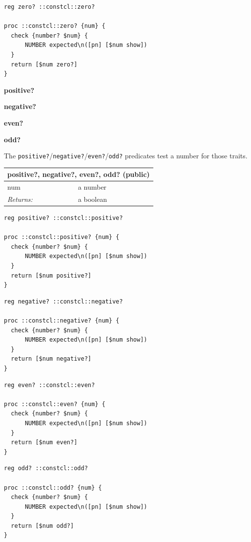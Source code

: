 \documentclass[twoside,9pt]{report}
\begin{document}
\noindent\makebox[\linewidth]{\rule{\linewidth}{0.4pt}}
\begin{lstlisting}
reg zero? ::constcl::zero?
 
proc ::constcl::zero? {num} {
  check {number? $num} {
      NUMBER expected\n([pn] [$num show])
  }
  return [$num zero?]
}
\end{lstlisting}
\noindent\makebox[\linewidth]{\rule{\linewidth}{0.4pt}}

\textbf{positive?}


\textbf{negative?}


\textbf{even?}


\textbf{odd?}


The \texttt{positive?}/\texttt{negative?}/\texttt{even?}/\texttt{odd?} predicates test a number for those traits.

\begin{tabular}{ |l l| }
\hline
\multicolumn{2}{|l|}{positive?, negative?, even?, odd? (public)} \\
\hline
num & a number \\
\textit{Returns:} & a boolean \\
\hline
\end{tabular}

\noindent\makebox[\linewidth]{\rule{\linewidth}{0.4pt}}
\begin{lstlisting}
reg positive? ::constcl::positive?
 
proc ::constcl::positive? {num} {
  check {number? $num} {
      NUMBER expected\n([pn] [$num show])
  }
  return [$num positive?]
}
\end{lstlisting}
\noindent\makebox[\linewidth]{\rule{\linewidth}{0.4pt}}
\noindent\makebox[\linewidth]{\rule{\linewidth}{0.4pt}}
\begin{lstlisting}
reg negative? ::constcl::negative?
 
proc ::constcl::negative? {num} {
  check {number? $num} {
      NUMBER expected\n([pn] [$num show])
  }
  return [$num negative?]
}
\end{lstlisting}
\noindent\makebox[\linewidth]{\rule{\linewidth}{0.4pt}}
\noindent\makebox[\linewidth]{\rule{\linewidth}{0.4pt}}
\begin{lstlisting}
reg even? ::constcl::even?
 
proc ::constcl::even? {num} {
  check {number? $num} {
      NUMBER expected\n([pn] [$num show])
  }
  return [$num even?]
}
\end{lstlisting}
\noindent\makebox[\linewidth]{\rule{\linewidth}{0.4pt}}
\noindent\makebox[\linewidth]{\rule{\linewidth}{0.4pt}}
\begin{lstlisting}
reg odd? ::constcl::odd?
 
proc ::constcl::odd? {num} {
  check {number? $num} {
      NUMBER expected\n([pn] [$num show])
  }
  return [$num odd?]
}
\end{lstlisting}
\noindent\makebox[\linewidth]{\rule{\linewidth}{0.4pt}}
\end{document}
